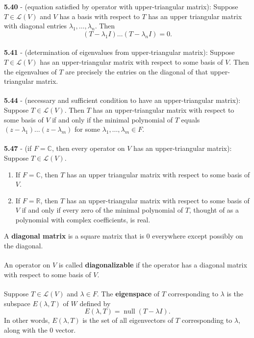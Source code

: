 \documentclass{article}
\DeclareMathOperator{\Null}{null}
\theoremstyle{definition}
\begin{document}
\textbf{5.40} - (equation satisfied by operator with upper-triangular matrix): Suppose $T \in \mathcal{L}(V)$ and $V$ has a basis with respect to $T$ has an upper triangular matrix with diagonal entries $\lambda_1, \dots, \lambda_n$. Then $$(T - \lambda_1 I) \dots (T - \lambda_n I) = 0.$$ \\
\textbf{5.41} - (determination of eigenvalues from upper-triangular matrix): Suppose $T \in \mathcal{L}(V)$ has an upper-triangular matrix with respect to some basis
of $V$. Then the eigenvalues of $T$ are precisely the entries on the diagonal of
that upper-triangular matrix. \\ \\
\textbf{5.44} - (necessary and sufficient condition to have an upper-triangular matrix): Suppose $T \in \mathcal{L}(V)$. Then $T$ has an upper-triangular matrix with respect
to some basis of $V$ if and only if the minimal polynomial of $T$ equals $(z - \lambda_1) \dots (z - \lambda_m)$ for some $\lambda_1, \dots, \lambda_m \in F$. \\ \\
\textbf{5.47} - (if $F = \mathbb{C}$, then every operator on $V$ has an upper-triangular matrix): Suppose $T \in \mathcal{L}(V)$. \begin{enumerate}
    \item If $F = \mathbb{C}$, then $T$ has an upper triangular matrix with respect to some basis of $V$. 
    \item If $F = \mathbb{R}$, then $T$ has an upper-triangular matrix with respect to some basis
of $V$ if and only if every zero of the minimal polynomial of $T$, thought of as a polynomial with complex coefficients, is real.
\end{enumerate} $ $ \\
A \textbf{diagonal matrix} is a square matrix that is 0 everywhere except possibly on the diagonal. \\ \\
An operator on $V$ is called \textbf{diagonalizable} if the operator has a diagonal matrix
with respect to some basis of $V$. \\ \\
Suppose $T \in \mathcal{L}(V)$ and $\lambda \in F$. The \textbf{eigenspace} of $T$ corresponding to $\lambda$ is the subspace $E(\lambda, T)$ of $W$ defined by $$E(\lambda, T) = \Null(T - \lambda I).$$ In other words, $E(\lambda, T)$ is the set of all eigenvectors of $T$ corresponding to $\lambda$, along with the 0 vector. \\ \\
\end{document}
